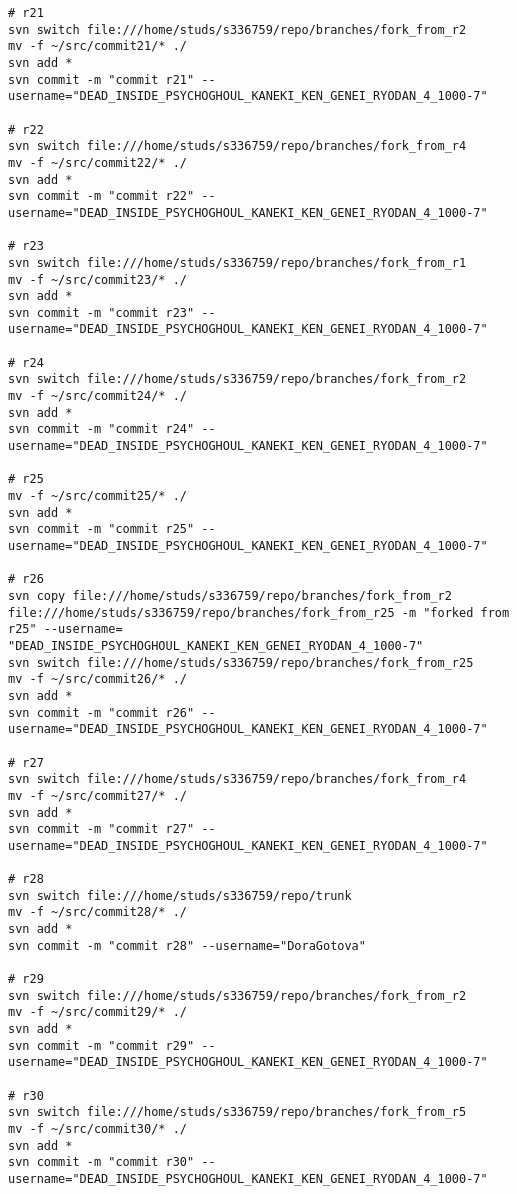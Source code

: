 \thispagestyle{empty}
\BgThispage
\tiny
\begin{verbatim}
# r21
svn switch file:///home/studs/s336759/repo/branches/fork_from_r2
mv -f ~/src/commit21/* ./
svn add *
svn commit -m "commit r21" --username="DEAD_INSIDE_PSYCHOGHOUL_KANEKI_KEN_GENEI_RYODAN_4_1000-7"

# r22
svn switch file:///home/studs/s336759/repo/branches/fork_from_r4
mv -f ~/src/commit22/* ./
svn add *
svn commit -m "commit r22" --username="DEAD_INSIDE_PSYCHOGHOUL_KANEKI_KEN_GENEI_RYODAN_4_1000-7"

# r23
svn switch file:///home/studs/s336759/repo/branches/fork_from_r1
mv -f ~/src/commit23/* ./
svn add *
svn commit -m "commit r23" --username="DEAD_INSIDE_PSYCHOGHOUL_KANEKI_KEN_GENEI_RYODAN_4_1000-7"

# r24
svn switch file:///home/studs/s336759/repo/branches/fork_from_r2
mv -f ~/src/commit24/* ./
svn add *
svn commit -m "commit r24" --username="DEAD_INSIDE_PSYCHOGHOUL_KANEKI_KEN_GENEI_RYODAN_4_1000-7"

# r25
mv -f ~/src/commit25/* ./
svn add *
svn commit -m "commit r25" --username="DEAD_INSIDE_PSYCHOGHOUL_KANEKI_KEN_GENEI_RYODAN_4_1000-7"

# r26
svn copy file:///home/studs/s336759/repo/branches/fork_from_r2 file:///home/studs/s336759/repo/branches/fork_from_r25 -m "forked from r25" --username=
"DEAD_INSIDE_PSYCHOGHOUL_KANEKI_KEN_GENEI_RYODAN_4_1000-7"
svn switch file:///home/studs/s336759/repo/branches/fork_from_r25
mv -f ~/src/commit26/* ./
svn add *
svn commit -m "commit r26" --username="DEAD_INSIDE_PSYCHOGHOUL_KANEKI_KEN_GENEI_RYODAN_4_1000-7"

# r27
svn switch file:///home/studs/s336759/repo/branches/fork_from_r4
mv -f ~/src/commit27/* ./
svn add *
svn commit -m "commit r27" --username="DEAD_INSIDE_PSYCHOGHOUL_KANEKI_KEN_GENEI_RYODAN_4_1000-7"

# r28
svn switch file:///home/studs/s336759/repo/trunk
mv -f ~/src/commit28/* ./
svn add *
svn commit -m "commit r28" --username="DoraGotova"

# r29
svn switch file:///home/studs/s336759/repo/branches/fork_from_r2
mv -f ~/src/commit29/* ./
svn add *
svn commit -m "commit r29" --username="DEAD_INSIDE_PSYCHOGHOUL_KANEKI_KEN_GENEI_RYODAN_4_1000-7"

# r30
svn switch file:///home/studs/s336759/repo/branches/fork_from_r5
mv -f ~/src/commit30/* ./
svn add *
svn commit -m "commit r30" --username="DEAD_INSIDE_PSYCHOGHOUL_KANEKI_KEN_GENEI_RYODAN_4_1000-7"


\end{verbatim}
